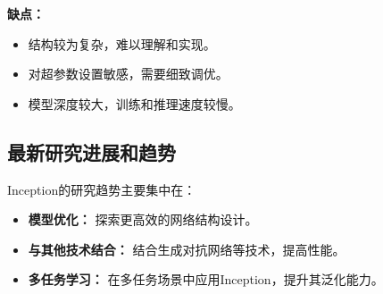 \textbf{缺点：}
\begin{itemize}
    \item 结构较为复杂，难以理解和实现。
    \item 对超参数设置敏感，需要细致调优。
    \item 模型深度较大，训练和推理速度较慢。
\end{itemize}

\subsection*{最新研究进展和趋势}
Inception的研究趋势主要集中在：
\begin{itemize}
    \item \textbf{模型优化：} 探索更高效的网络结构设计。
    \item \textbf{与其他技术结合：} 结合生成对抗网络等技术，提高性能。
    \item \textbf{多任务学习：} 在多任务场景中应用Inception，提升其泛化能力。
\end{itemize}
